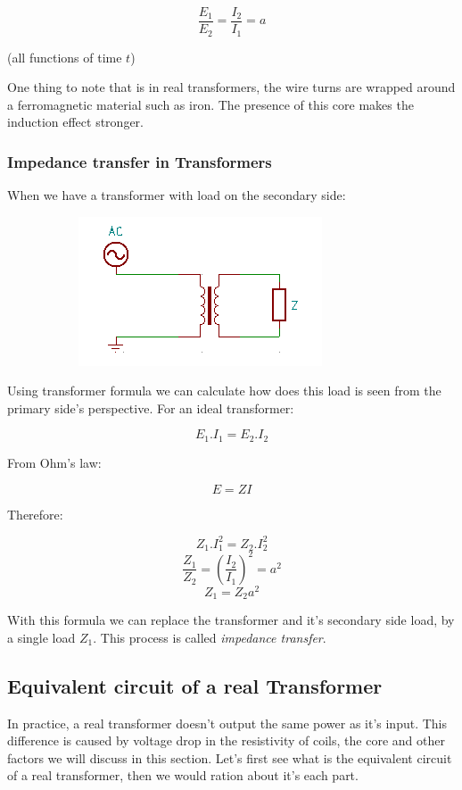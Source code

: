 \documentclass{article}
\begin{document}
	$$ \frac{E_1}{E_2} = \frac{I_2}{I_1} = a $$
	
	(all functions of time $t$)	
	
	One thing to note that is in real transformers, the wire turns are wrapped around a ferromagnetic material such as iron.
	The presence of this core makes the induction effect stronger.
	
	\subsubsection{Impedance transfer in Transformers}
	When we have a transformer with load on the secondary side:
		
	\begin{figure}[h!]
	\centering
	\begin{subfigure}[b]{0.45\linewidth}
		\includegraphics[width=\linewidth]{with_impedance.png}
	\end{subfigure}
	\end{figure}
	
	Using transformer formula we can calculate how does this load is seen from the primary side's perspective.
	For an ideal transformer:

	$$ E_1.I_1 = E_2.I_2$$
	
	From Ohm's law:
	
	$$E = ZI$$
	
	Therefore:
	
	$$ Z_1.I_1^2 = Z_2.I_2^2$$
	$$ \frac{Z_1}{Z_2} = (\frac{I_2}{I_1})^2 = a^2$$	
	$$ Z_1 = Z_2a^2$$
	
	With this formula we can replace the transformer and it's secondary side load, by a single load $Z_1$. This process is called \textit{impedance transfer}.
	
	\subsection{Equivalent circuit of a real Transformer}
	In practice, a real transformer doesn't output the same power as it's input.
	This difference is caused by voltage drop in the resistivity of coils, the core and other factors we will discuss in this section.
	Let's first see what is the equivalent circuit of a real transformer, then we would ration about it's each part.
	
\end{document}
